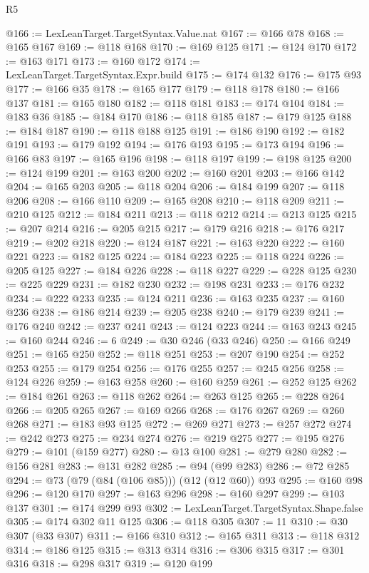 \begin{lexlean}{R5}
\begin{coremodule}
@166 := LexLeanTarget.TargetSyntax.Value.nat
@167 := @166 @78
@168 := @165 @167
@169 := @118 @168
@170 := @169 @125
@171 := @124 @170
@172 := @163 @171
@173 := @160 @172
@174 := LexLeanTarget.TargetSyntax.Expr.build
@175 := @174 @132
@176 := @175 @93
@177 := @166 @35
@178 := @165 @177
@179 := @118 @178
@180 := @166 @137
@181 := @165 @180
@182 := @118 @181
@183 := @174 @104
@184 := @183 @36
@185 := @184 @170
@186 := @118 @185
@187 := @179 @125
@188 := @184 @187
@190 := @118 @188 @125
@191 := @186 @190
@192 := @182 @191
@193 := @179 @192
@194 := @176 @193
@195 := @173 @194
@196 := @166 @83
@197 := @165 @196
@198 := @118 @197
@199 := @198 @125
@200 := @124 @199
@201 := @163 @200
@202 := @160 @201
@203 := @166 @142
@204 := @165 @203
@205 := @118 @204
@206 := @184 @199
@207 := @118 @206
@208 := @166 @110
@209 := @165 @208
@210 := @118 @209
@211 := @210 @125
@212 := @184 @211
@213 := @118 @212
@214 := @213 @125
@215 := @207 @214
@216 := @205 @215
@217 := @179 @216
@218 := @176 @217
@219 := @202 @218
@220 := @124 @187
@221 := @163 @220
@222 := @160 @221
@223 := @182 @125
@224 := @184 @223
@225 := @118 @224
@226 := @205 @125
@227 := @184 @226
@228 := @118 @227
@229 := @228 @125
@230 := @225 @229
@231 := @182 @230
@232 := @198 @231
@233 := @176 @232
@234 := @222 @233
@235 := @124 @211
@236 := @163 @235
@237 := @160 @236
@238 := @186 @214
@239 := @205 @238
@240 := @179 @239
@241 := @176 @240
@242 := @237 @241
@243 := @124 @223
@244 := @163 @243
@245 := @160 @244
@246 := 6
@249 := @30 @246 (@33 @246)
@250 := @166 @249
@251 := @165 @250
@252 := @118 @251
@253 := @207 @190
@254 := @252 @253
@255 := @179 @254
@256 := @176 @255
@257 := @245 @256
@258 := @124 @226
@259 := @163 @258
@260 := @160 @259
@261 := @252 @125
@262 := @184 @261
@263 := @118 @262
@264 := @263 @125
@265 := @228 @264
@266 := @205 @265
@267 := @169 @266
@268 := @176 @267
@269 := @260 @268
@271 := @183 @93 @125
@272 := @269 @271
@273 := @257 @272
@274 := @242 @273
@275 := @234 @274
@276 := @219 @275
@277 := @195 @276
@279 := @101 (@159 @277)
@280 := @13 @100
@281 := @279 @280
@282 := @156 @281
@283 := @131 @282
@285 := @94 (@99 @283)
@286 := @72 @285
@294 := @73 (@79 (@84 (@106 @85))) (@12 (@12 @60)) @93
@295 := @160 @98
@296 := @120 @170
@297 := @163 @296
@298 := @160 @297
@299 := @103 @137
@301 := @174 @299 @93
@302 := LexLeanTarget.TargetSyntax.Shape.false
@305 := @174 @302 @11 @125
@306 := @118 @305
@307 := 11
@310 := @30 @307 (@33 @307)
@311 := @166 @310
@312 := @165 @311
@313 := @118 @312
@314 := @186 @125
@315 := @313 @314
@316 := @306 @315
@317 := @301 @316
@318 := @298 @317
@319 := @120 @199

\end{coremodule}
\end{lexlean}
